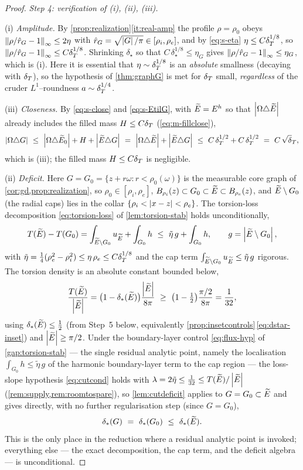 \begin{proof}
\emph{Step 4: verification of (i), (ii), (iii).}

\noindent\textup{(i)} \emph{Amplitude.} By
\cref{prop:realization}\ref{it:real-amp} the profile $\rho=\rho_0$ obeys
$\left\lVert\rho/\hat r_G-1\right\rVert_\infty\le2\eta$ with $\hat r_G=\sqrt{\left\lvert G\right\rvert/\pi}\in
[\rho_i,\rho_e]$, and by \eqref{eq:s-eta} $\eta\le C\delta_T^{1/8}$, so
$\left\lVert\rho/\hat r_G-1\right\rVert_\infty\le C\delta_T^{1/8}$. Shrinking $\delta_\star$ so
that $C\,\delta_\star^{1/8}\le\eta_G$ gives
$\left\lVert\rho/\hat r_G-1\right\rVert_\infty\le\eta_G$, which is (i). Here it is essential
that $\eta\sim\delta_T^{1/8}$ is an \emph{absolute} smallness (decaying with
$\delta_T$), so the hypothesis of \cref{thm:graphG} is met for $\delta_T$ small,
\emph{regardless} of the cruder $L^1$--roundness $a\sim\delta_T^{1/4}$.

\noindent\textup{(iii)} \emph{Closeness.} By \eqref{eq:s-close} and
\eqref{eq:s-EtilG}, with $\widetilde{E}=E^h$ so that $\left\lvert\Omega\triangle\widetilde{E}\right\rvert$ already
includes the filled mass $H\le C\delta_T$ (\eqref{eq:m-fillclose}),
\[
   \abs{\Om\triangle G}\ \le\ \abs{\Om\triangle\Etil_0}+H+\abs{\Etil\triangle G}
   \ =\ \abs{\Om\triangle\Etil}+\abs{\Etil\triangle G}
   \ \le\ C\,\dT^{1/2}+C\,\dT^{1/2}\ =\ C\,\sqrt\dT,
\]
which is (iii); the filled mass $H\le C\delta_T$ is negligible.

\noindent\textup{(ii)} \emph{Deficit.} Here $G=G_0=
\{z+r\omega:r<\rho_0(\omega)\}$ is the measurable core graph of
\cref{cor:gd,prop:realization}, so $\rho_0\in
[\rho_i,\rho_e]$, $B_{\rho_i}(z)\subset G_0\subset\widetilde{E}\subset B_{\rho_e}(z)$,
and $\widetilde{E}\setminus G_0$ (the radial caps) lies in the collar
$\{\rho_i<\left\lvert x-z\right\rvert<\rho_e\}$. The torsion-loss decomposition
\eqref{eq:torsion-loss} of \cref{lem:torsion-stab} holds unconditionally,
\[
   T(\widetilde{E})-T(G_0)=\int_{\widetilde{E}\setminus G_0}u_{\widetilde{E}}+\int_{G_0}h
   \ \le\ \tilde\eta\,g+\int_{G_0}h,
   \qquad g=\left\lvert\widetilde{E}\setminus G_0\right\rvert,
\]
with $\tilde\eta=\tfrac14(\rho_e^2-\rho_i^2)\le\eta\,\rho_e\le C\delta_T^{1/8}$ and
the cap term $\int_{\widetilde{E}\setminus G_0}u_{\widetilde{E}}\le\tilde\eta\,g$ rigorous. The
torsion density is an absolute constant bounded below,
\[
   \frac{T(\widetilde{E})}{\left\lvert\widetilde{E}\right\rvert}
   =\bigl(1-\delta_{*}(\widetilde{E})\bigr)\frac{\left\lvert\widetilde{E}\right\rvert}{8\pi}
   \ \ge\ \bigl(1-\tfrac12\bigr)\frac{\pi/2}{8\pi}=\frac1{32},
\]
using $\delta_{*}(\widetilde{E})\le\tfrac12$ (from Step~5 below, equivalently
\cref{prop:insetcontrols}\,\eqref{eq:dstar-inset}) and $\left\lvert\widetilde{E}\right\rvert\ge\pi/2$.
Under the boundary-layer control \eqref{eq:flux-hyp} of
\cref{gap:torsion-stab} --- the single residual analytic point, namely the
localisation $\int_{G_0}h\le\tilde\eta\,g$ of the harmonic boundary-layer
term to the cap region --- the loss-slope hypothesis \eqref{eq:cutcond} holds
with $\lambda=2\tilde\eta\le\tfrac1{32}\le T(\widetilde{E})/\left\lvert\widetilde{E}\right\rvert$
(\cref{rem:supply,rem:roomtospare}), so \cref{lem:cutdeficit} applies to
$G=G_0\subset\widetilde{E}$ and gives directly, with no further regularisation step
(since $G=G_0$),
\begin{equation}\label{eq:s-defchain}
   \delta_{*}(G)\ =\ \delta_{*}(G_0)\ \le\ \delta_{*}(\widetilde{E}).
\end{equation}
This is the only place in the reduction where a residual analytic point is
invoked; everything else --- the exact decomposition, the cap term, and the
deficit algebra --- is unconditional.


\end{proof}
